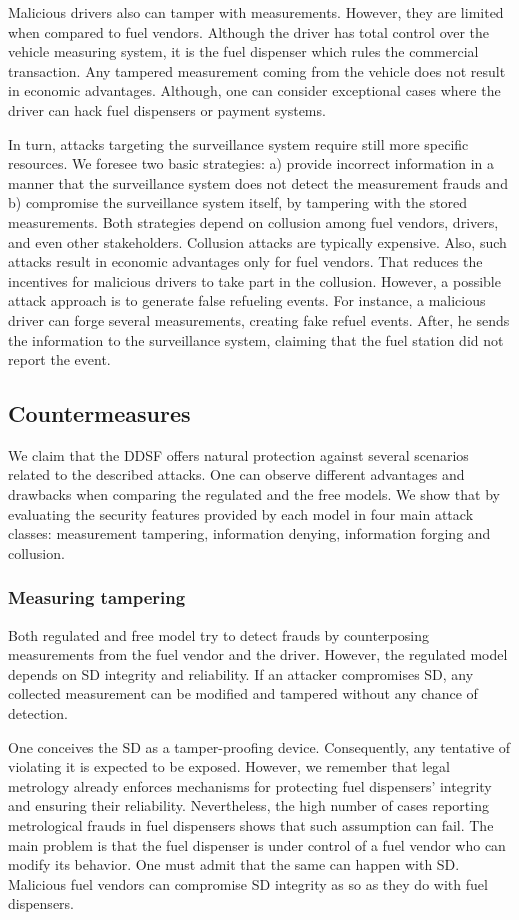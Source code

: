 \documentclass[sigplan]{acmart}
\begin{document}
Malicious drivers also can tamper with measurements.
However, they are limited when compared to fuel vendors.
Although the driver has total control over the vehicle measuring system, it is the fuel dispenser which rules the commercial transaction.
Any tampered measurement coming from the vehicle does not result in economic advantages.
Although, one can consider exceptional cases where the driver can hack fuel dispensers or payment systems.

In turn, attacks targeting the surveillance system require still more specific resources.
We foresee two basic strategies: a) provide incorrect information in a manner that the surveillance system does not detect the measurement frauds and b) compromise the surveillance system itself, by tampering with the stored measurements.
Both strategies depend on collusion among fuel vendors, drivers, and even other stakeholders.
Collusion attacks are typically expensive.
Also, such attacks result in economic advantages only for fuel vendors.
That reduces the incentives for malicious drivers to take part in the collusion.
However, a possible attack approach is to generate false refueling events.
For instance, a malicious driver can forge several measurements,  creating fake refuel events.
After, he sends the information to the surveillance system, claiming that the fuel station did not report the event.

\subsection{Countermeasures}
We claim that the DDSF offers natural protection against several scenarios related to the described attacks.
One can observe different advantages and drawbacks when comparing the regulated and the free models.
We show that by evaluating the security features provided by each model in four main attack classes: measurement tampering, information denying, information forging and collusion.

\subsubsection{Measuring tampering}
Both regulated and free model try to detect frauds by counterposing measurements from the fuel vendor and the driver.
However, the regulated model depends on SD integrity and reliability.
If an attacker compromises SD, any collected measurement can be modified and tampered without any chance of detection.

One conceives the SD as a tamper-proofing device.
Consequently, any tentative of violating it is expected to be exposed.
However, we remember that legal metrology already enforces mechanisms for protecting fuel dispensers' integrity and ensuring their reliability.
Nevertheless, the high number of cases reporting metrological frauds in fuel dispensers shows that such assumption can fail.
The main problem is that the fuel dispenser is under control of a fuel vendor who can modify its behavior.
One must admit that the same can happen with SD.
Malicious fuel vendors can compromise SD integrity as so as they do with fuel dispensers.
\end{document}
